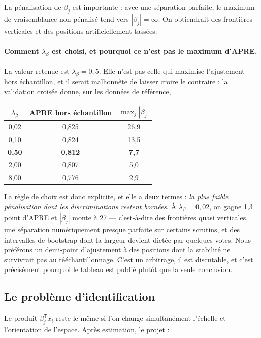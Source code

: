 \documentclass[11pt,a4paper]{article}
\begin{document}
La pénalisation de $\beta_j$ est importante : avec une séparation parfaite,
le maximum de vraisemblance non pénalisé tend vers $|\beta_j|=\infty$. On
obtiendrait des frontières verticales et des positions artificiellement tassées.

\paragraph{Comment $\lambda_\beta$ est choisi, et pourquoi ce n'est pas le
maximum d'APRE.} La valeur retenue est $\lambda_\beta=0{,}5$. Elle n'est pas
celle qui maximise l'ajustement hors échantillon, et il serait malhonnête de
laisser croire le contraire : la validation croisée donne, sur les données de
référence,

\begin{center}
\begin{tabular}{ccc}
\toprule
$\lambda_\beta$ & APRE hors échantillon & $\max_j|\beta_j|$ \\
\midrule
0,02 & 0,825 & 26,9 \\
0,10 & 0,824 & 13,5 \\
\textbf{0,50} & \textbf{0,812} & \textbf{7,7} \\
2,00 & 0,807 & 5,0 \\
8,00 & 0,776 & 2,9 \\
\bottomrule
\end{tabular}
\end{center}

La règle de choix est donc explicite, et elle a deux termes : \emph{la plus
faible pénalisation dont les discriminations restent bornées}. À
$\lambda_\beta=0{,}02$, on gagne 1,3 point d'APRE et $|\beta_j|$ monte à 27 —
c'est-à-dire des frontières quasi verticales, une séparation numériquement
presque parfaite sur certains scrutins, et des intervalles de bootstrap dont la
largeur devient dictée par quelques votes. Nous préférons un demi-point
d'ajustement à des positions dont la stabilité ne survivrait pas au
rééchantillonnage. C'est un arbitrage, il est discutable, et c'est précisément
pourquoi le tableau est publié plutôt que la seule conclusion.

\subsection{Le problème d'identification}

Le produit $\beta_j^{\mathsf T}x_i$ reste le même si l'on change simultanément
l'échelle et l'orientation de l'espace. Après estimation, le projet :
\end{document}
